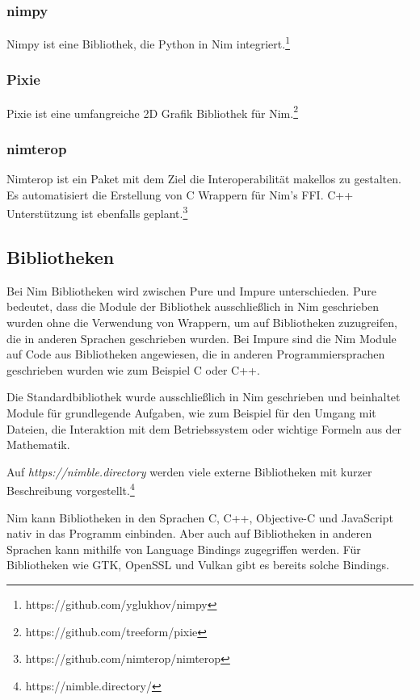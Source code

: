\documentclass[11pt]{report}
\begin{document}
\subsubsection{nimpy}
Nimpy ist eine Bibliothek, die Python in Nim integriert.\footnote{https://github.com/yglukhov/nimpy}

\subsubsection{Pixie}
Pixie ist eine umfangreiche 2D Grafik Bibliothek für Nim.\footnote{https://github.com/treeform/pixie}

\subsubsection{nimterop}
Nimterop ist ein Paket mit dem Ziel die Interoperabilität makellos zu gestalten. Es automatisiert die Erstellung von C Wrappern für Nim's FFI.
C++ Unterstützung ist ebenfalls geplant.\footnote{https://github.com/nimterop/nimterop}

\subsection{Bibliotheken}
Bei Nim Bibliotheken wird zwischen Pure und Impure unterschieden.
Pure bedeutet, dass die Module der Bibliothek ausschließlich in Nim geschrieben wurden ohne die Verwendung von Wrappern, um auf Bibliotheken zuzugreifen, die in anderen Sprachen geschrieben wurden.
Bei Impure sind die Nim Module auf Code aus Bibliotheken angewiesen, die in anderen Programmiersprachen geschrieben wurden wie zum Beispiel C oder C++.

Die Standardbibliothek wurde ausschließlich in Nim geschrieben und beinhaltet Module für grundlegende Aufgaben, wie zum Beispiel für den Umgang mit Dateien, die Interaktion mit dem Betriebssystem oder wichtige Formeln aus der Mathematik.

Auf \emph{https://nimble.directory} werden viele externe Bibliotheken mit kurzer Beschreibung vorgestellt.\footnote{https://nimble.directory/}

Nim kann Bibliotheken in den Sprachen C, C++, Objective-C und JavaScript nativ in das Programm einbinden. Aber auch auf Bibliotheken in anderen Sprachen kann mithilfe von Language Bindings zugegriffen werden. Für Bibliotheken wie GTK, OpenSSL und Vulkan gibt es bereits solche Bindings.
\end{document}
